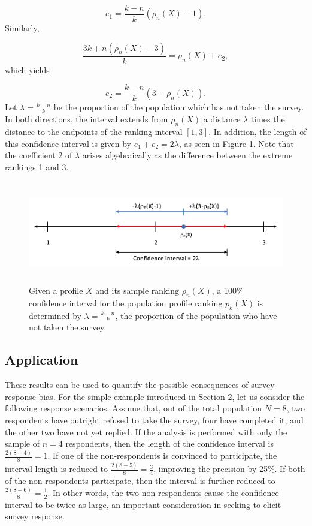 \documentclass[a4paper, 12pt]{article}
\begin{document}
\begin{equation}
e_1 = \frac{k-n}{k}(\rho_n(X)-1).
\end{equation}
\label{eq:11}
{\flushleft Similarly,}

\begin{equation}
\frac{3k+n(\rho_n(X)-3)}{k} = \rho_n(X)+e_2,
\end{equation}
\label{eq:12}
{\flushleft which} yields

\begin{equation}
e_2=\frac{k-n}{k}(3-\rho_n(X)).
\end{equation}
\label{eq:13}
{\flushleft Let} $\lambda=\frac{k-n}{k}$ be the proportion of the population which has not taken the survey. In both directions, the interval extends from $\rho_n(X)$ a distance $\lambda$ times the distance to the endpoints of the ranking interval $[1, 3]$. In addition, the length of this confidence interval is given by  $e_1+e_2=2\lambda$, as seen in Figure \ref{AL}. Note that the coefficient 2 of $\lambda$ arises algebraically as the difference between  the extreme rankings 1 and 3.

\begin{figure}[!htpb]
\centering
\includegraphics[width=6.5in, height=1.75in]{Confidence_Interval.png}
\caption{Given a profile $X$ and its sample ranking $\rho_n(X)$, a 100\% confidence interval for the population profile ranking $p_k(X)$ is determined by $\lambda=\frac{k-n}{k}$, the proportion of the population who have not taken the survey.}
\label{AL}
\end{figure}


\subsection{Application}

These results can be used to quantify the possible consequences of survey response bias. For the simple example introduced in Section 2, let us consider the following response scenarios. Assume that, out of the total population $N=8$, two respondents have outright refused to take the survey, four have completed it, and the other two have not yet replied. If the analysis is performed with only the sample of $n=4$ respondents, then the length of the confidence interval is  $\frac{2(8-4)}{8}=1$. If one of the non-respondents is convinced to participate, the interval length is reduced to $\frac{2(8-5)}{8}=\frac{3}{4}$, improving the precision by 25\%. If both of the non-respondents participate, then the interval is further reduced to $\frac{2(8-6)}{8}=\frac{1}{2}$. In other words, the two non-respondents  cause the confidence interval to be twice as large, an important consideration in seeking to elicit survey response.
\end{document}
